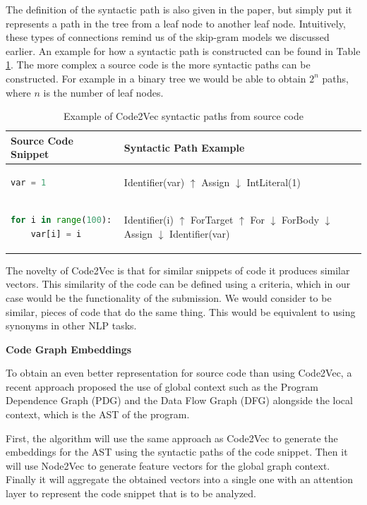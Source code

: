 \documentclass[12pt,a4paper]{report}
\begin{document}
The definition of the syntactic path is also given in the paper, but simply put it represents a path in the tree from a leaf node to another leaf node. Intuitively, these types of connections remind us of the skip-gram models we discussed earlier. An example for how a syntactic path is constructed can be found in Table \ref{tab:relatedwork2}. The more complex a source code is the more syntactic paths can be constructed. For example in a binary tree we would be able to obtain $2^n$ paths, where $n$ is the number of leaf nodes.

\begin{table}[H]\small\linespread{1}
\centering
\caption{Example of Code2Vec syntactic paths from source code}
\label{tab:relatedwork2}
\begin{tabular}{l p{10cm}}
\textbf{Source Code Snippet} & \textbf{Syntactic Path Example} \\
\hline
\begin{lstlisting}[language=Python]
var = 1
\end{lstlisting} & Identifier(var) $\uparrow$ Assign $\downarrow$ IntLiteral(1) \\
\hline
\begin{lstlisting}[language=Python]
for i in range(100):
    var[i] = i
\end{lstlisting} & Identifier(i) $\uparrow$ ForTarget $\uparrow$ For $\downarrow$ ForBody $\downarrow$ Assign $\downarrow$ Identifier(var) \\
\end{tabular}
\end{table}

The novelty of Code2Vec is that for similar snippets of code it produces similar vectors. This similarity of the code can be defined using a criteria, which in our case would be the functionality of the submission. We would consider to be similar, pieces of code that do the same thing. This would be equivalent to using synonyms in other NLP tasks.

\textbf{Code Graph Embeddings}

To obtain an even better representation for source code than using Code2Vec, a recent approach \cite{10.1145/3360588} proposed the use of global context such as the Program Dependence Graph (PDG) and the Data Flow Graph (DFG) alongside the local context, which is the AST of the program.

First, the algorithm will use the same approach as Code2Vec to generate the embeddings for the AST using the syntactic paths of the code snippet. Then it will use Node2Vec \cite{grover2016node2vec} to generate feature vectors for the global graph context. Finally it will aggregate the obtained vectors into a single one with an attention layer to represent the code snippet that is to be analyzed.
\end{document}
